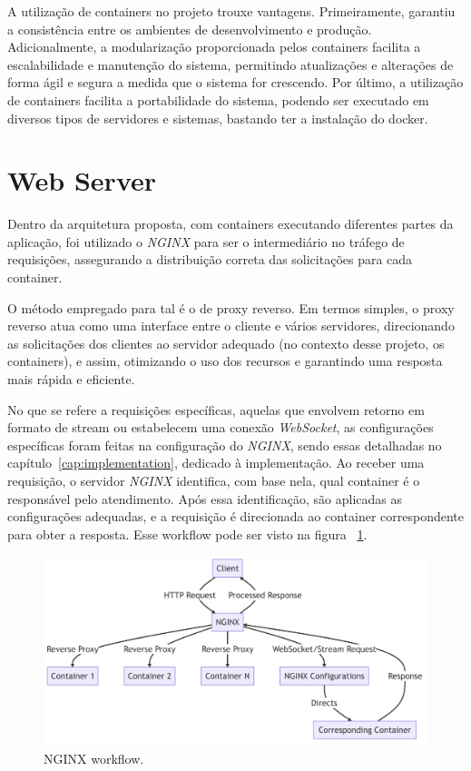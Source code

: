 A utilização de containers no projeto trouxe vantagens. Primeiramente, garantiu a consistência entre os ambientes de desenvolvimento e produção. Adicionalmente, a modularização proporcionada pelos containers facilita a escalabilidade e manutenção do sistema, permitindo atualizações e alterações de forma ágil e segura a medida que o sistema for crescendo. Por último, a utilização de containers facilita a portabilidade do sistema, podendo ser executado em diversos tipos de servidores e sistemas, bastando ter a instalação do docker.


\section{Web Server}\label{sec:webserver}

Dentro da arquitetura proposta, com containers executando diferentes partes da aplicação, foi utilizado o \textit{NGINX} \cite{nginxDocs} para ser o intermediário no tráfego de requisições, assegurando a distribuição correta das solicitações para cada container. 

O método empregado para tal é o de proxy reverso. Em termos simples, o proxy reverso atua como uma interface entre o cliente e vários servidores, direcionando as solicitações dos clientes ao servidor adequado  (no contexto desse projeto, os containers), e assim, otimizando o uso dos recursos e garantindo uma resposta mais rápida e eficiente.

No que se refere a requisições específicas, aquelas que envolvem retorno em formato de stream ou estabelecem uma conexão \textit{WebSocket}, as configurações específicas foram feitas na configuração do \textit{NGINX}, sendo essas detalhadas no capítulo~\ref{cap:implementation},  dedicado à implementação. Ao receber uma requisição, o servidor \textit{NGINX} identifica, com base nela, qual container é o responsável pelo atendimento. Após essa identificação, são aplicadas as configurações adequadas, e a requisição é direcionada ao container correspondente para obter a resposta. Esse workflow pode ser visto na figura ~\ref{fig:nginx_workflow}.

\begin{figure}[htbp]
	\centering
	\includegraphics[width=\textwidth]{images/diagrama_nginx.png}
	\caption{NGINX workflow.}
	\label{fig:nginx_workflow}
\end{figure}

